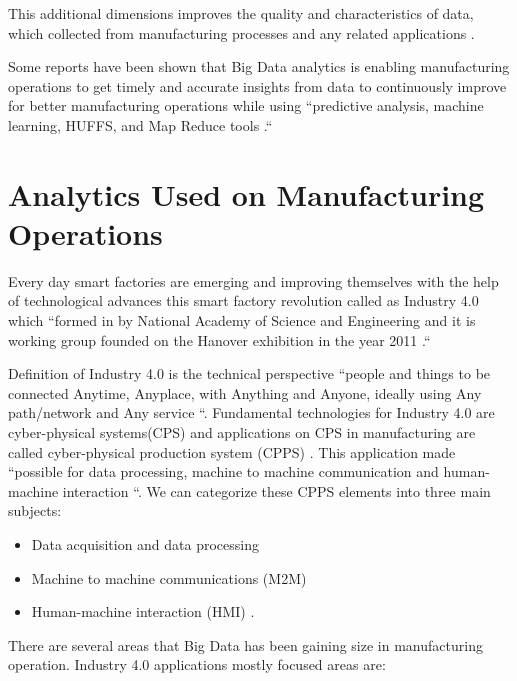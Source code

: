 \documentclass[sigconf]{acmart}
\begin{document}
\par This additional dimensions improves the quality and characteristics of data, which collected from manufacturing processes and any related applications \cite{BABICEANU2016128}.
\par Some reports have been shown that Big Data analytics is enabling manufacturing operations to get timely and accurate insights from data to continuously improve for better manufacturing operations while using ``predictive analysis, machine learning, HUFFS, and Map Reduce tools \cite{BABICEANU2016128}.``  


\section{Analytics Used on Manufacturing Operations}

 Every day smart factories are emerging and improving themselves with the help of technological advances this smart factory revolution called as Industry 4.0 which ``formed in by National Academy of Science and Engineering and it is working group founded on the Hanover exhibition in the year 2011 \cite{WAGNER2017125}.`` 

\par Definition of Industry 4.0 is the technical perspective ``people and things to be connected Anytime, Anyplace, with Anything and Anyone, ideally using Any path/network and Any service \cite{saint-exupery}``. Fundamental technologies for Industry 4.0 are cyber-physical systems(CPS) and applications on CPS in manufacturing are called cyber-physical production system (CPPS) \cite{WAGNER2017125}. This application made ``possible for data processing, machine to machine communication and human-machine interaction \cite{WAGNER2017125}``. We can categorize these CPPS elements into three main subjects:

\begin{itemize}
    \item Data acquisition and data processing
    \item Machine to machine communications (M2M)
    \item Human-machine interaction (HMI) \cite{WAGNER2017125}.
\end{itemize}

\par There are several areas that Big Data has been gaining size in manufacturing operation. Industry 4.0 applications mostly focused areas are:
\end{document}

